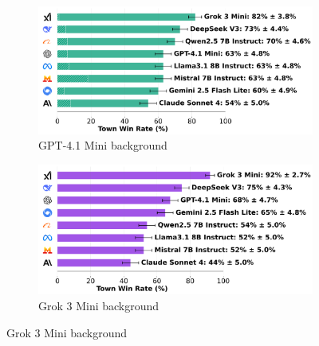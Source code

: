 \documentclass{article}
\begin{document}
\begin{figure}[htbp]
    \centering
    \begin{subfigure}[b]{0.48\textwidth}
        \centering
        \includegraphics[width=\textwidth]{../results/villager_gpt-4.1_mini_v4_1_benchmark.png}
        \caption{GPT-4.1 Mini background}
        \label{fig:villager_gpt41mini_appendix}
    \end{subfigure}
    \hfill
    \begin{subfigure}[b]{0.48\textwidth}
        \centering
        \includegraphics[width=\textwidth]{../results/villager_grok_3_mini_v4_1_benchmark.png}
        \caption{Grok 3 Mini background}
        \label{fig:villager_grok3_appendix}
    \end{subfigure}
    
    \vspace{0.5cm}
    

\end{figure}
\end{document}
